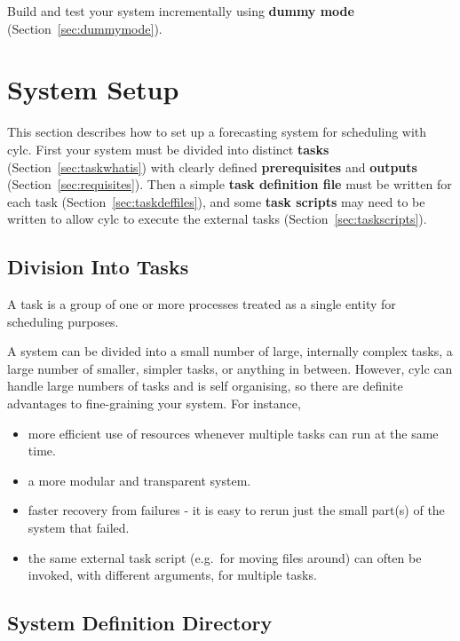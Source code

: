 \documentclass[11pt,a4paper]{article}
\begin{document}
Build and test your system incrementally using {\bf dummy mode}
(Section~\ref{sec:dummymode}).


\pagebreak
\label{sec:tasks}
\section{System Setup}

This section describes how to set up a forecasting system for scheduling
with cylc. First your system must be divided into distinct {\bf tasks}
(Section~\ref{sec:taskwhatis}) with clearly defined {\bf prerequisites} and
{\bf outputs} (Section~\ref{sec:requisites}). Then a simple {\bf task
definition file} must be written for each task
(Section~\ref{sec:taskdeffiles}), and some {\bf task scripts} may need
to be written to allow cylc to execute the external tasks
(Section~\ref{sec:taskscripts}).

\label{sec:divisionintotasks}
\subsection{Division Into Tasks}

\begin{shaded}
A task is a group of one or more processes treated as a single entity
for scheduling purposes.
\end{shaded}

A system can be divided into a small number of large, internally
complex tasks, a large number of smaller, simpler tasks, or anything
in between. However, cylc can handle large numbers of tasks and is self
organising, so there are definite advantages to fine-graining your
system. For instance,

\begin{itemize}
    \item more efficient use of resources whenever multiple tasks can
        run at the same time.
    \item a more modular and transparent system.
    \item faster recovery from failures - it is easy to rerun just the
        small part(s) of the system that failed. 
    \item the same external task script (e.g.\ for moving files around)
        can often be invoked, with different arguments, for multiple tasks.
\end{itemize}


\label{sec:systemdefdir}
\subsection{System Definition Directory}
\end{document}
